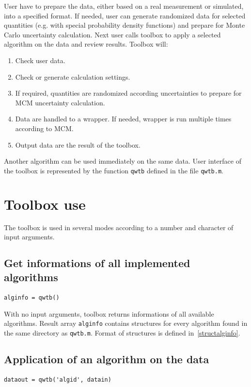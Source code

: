 \documentclass[12pt,a4paper,oneside]{report} %
\begin{document}
User have to prepare the data, either based on a real measurement or simulated, into a specified
format. If needed, user can generate randomized data for selected quantities (e.g. with special
probability density functions) and prepare for Monte Carlo uncertainty calculation. Next user calls
toolbox to apply a selected algorithm on the data and review results. Toolbox will:
\begin{enumerate}
        \item Check user data.
        \item Check or generate calculation settings.
        \item If required, quantities are randomized according uncertainties to prepare for MCM uncertainty calculation.
        \item Data are handled to a wrapper. If needed, wrapper is run multiple times according to MCM.
        \item Output data are the result of the toolbox.
\end{enumerate}

Another algorithm can be used immediately on the same data. User interface of the toolbox is represented
by the function \lstinline{qwtb} defined in the file {\tt qwtb.m}.

\section{Toolbox use} %
The toolbox is used in several modes according to a number and character of input arguments.

\subsection{Get informations of all implemented algorithms} %
\begin{lstlisting}
alginfo = qwtb()
\end{lstlisting}

With no input arguments, toolbox returns informations of all available algorithms. Result array
\lstinline{alginfo} contains structures for every algorithm found in the same directory as
\texttt{qwtb.m}. Format of structures is defined in~\ref{structalginfo}.

\subsection{Application of an algorithm on the data} %
\begin{lstlisting}
dataout = qwtb('algid', datain)
\end{lstlisting}
\end{document}
